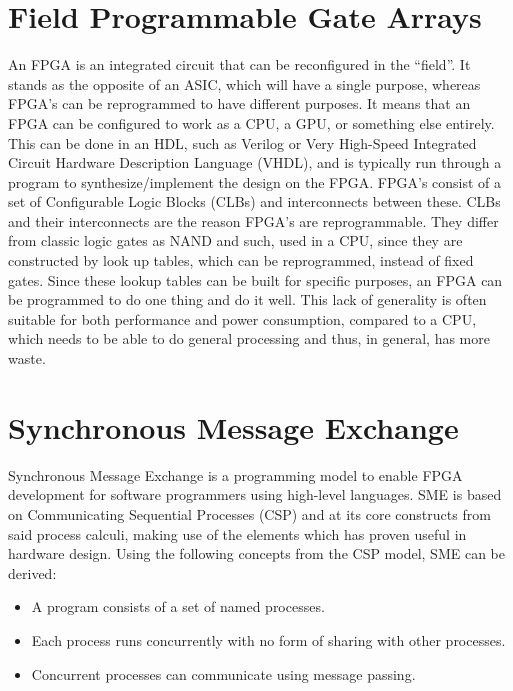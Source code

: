 \documentclass[a4paper, openany]{book}
\begin{document}
\section{Field Programmable Gate Arrays}
\label{sec:org7ca1f0a}
An FPGA is an integrated circuit that can be reconfigured in the ``field''. It stands as the opposite of an ASIC, which will have a single purpose, whereas FPGA's can be reprogrammed to have different purposes. It means that an FPGA can be configured to work as a CPU, a GPU, or something else entirely. This can be done in an HDL, such as Verilog or Very High-Speed Integrated Circuit Hardware Description Language (VHDL), and is typically run through a program to synthesize/implement the design on the FPGA.
FPGA's consist of a set of Configurable Logic Blocks (CLBs) and interconnects between these. CLBs and their interconnects are the reason FPGA's are reprogrammable. They differ from classic logic gates as NAND and such, used in a CPU, since they are constructed by look up tables, which can be reprogrammed, instead of fixed gates. Since these lookup tables can be built for specific purposes, an FPGA can be programmed to do one thing and do it well. This lack of generality is often suitable for both performance and power consumption, compared to a CPU, which needs to be able to do general processing and thus, in general, has more waste.

\section{Synchronous Message Exchange}
\label{sec:SME}
Synchronous Message Exchange is a programming model to enable FPGA development for software programmers using high-level languages. SME is based on Communicating Sequential Processes (CSP) and at its core constructs from said process calculi, making use of the elements which has proven useful in hardware design\cite{sme}. Using the following concepts from the CSP model\cite{CSP}, SME can be derived:

\begin{itemize}
\item A program consists of a set of named processes.
\item Each process runs concurrently with no form of sharing with other processes.
\item Concurrent processes can communicate using message passing.
\end{itemize}
\end{document}
